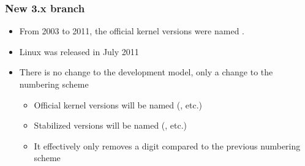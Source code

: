 \begin{frame}
  \frametitle{New 3.x branch}
  \begin{itemize}
  \item From 2003 to 2011, the official kernel versions were named .
  \item Linux  was released in July 2011
  \item There is no change to the development model, only a change to
    the numbering scheme
    \begin{itemize}
    \item Official kernel versions will be named 
      (, etc.)
    \item Stabilized versions will be named 
      (, etc.)
    \item It effectively only removes a digit compared to the previous
      numbering scheme
    \end{itemize}
  \end{itemize}
\end{frame}

